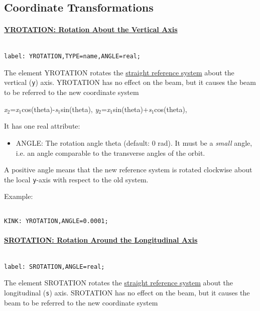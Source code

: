




\subsection{Coordinate Transformations}

\paragraph{\href{yrotation}{YROTATION: Rotation About the Vertical Axis}}
\begin{verbatim}

label: YROTATION,TYPE=name,ANGLE=real;
\end{verbatim} The element YROTATION rotates the \href{local_system.html#straight}{straight reference system} about the vertical (\texttt{y}) axis. YROTATION has no effect on the beam, but it causes the beam to be referred to the new coordinate system 

\textit{x}$_2$=\textit{x}$_1$cos(theta)-\textit{s}$_1$sin(theta), \textit{y}$_2$=\textit{x}$_1$sin(theta)+\textit{s}$_1$cos(theta), 

 It has one real attribute: 
\begin{itemize}
	\item ANGLE: The rotation angle theta (default: 0 rad). It must be a \emph{small} angle, i.e. an angle comparable to the transverse angles of the orbit. 
\end{itemize} A positive angle means that the new reference system is rotated clockwise about the local \texttt{y}-axis with respect to the old system. 

 Example: 
\begin{verbatim}

KINK: YROTATION,ANGLE=0.0001;
\end{verbatim}

\paragraph{\href{srotation}{SROTATION: Rotation Around the Longitudinal Axis}}
\begin{verbatim}

label: SROTATION,ANGLE=real;
\end{verbatim} The element SROTATION rotates the \href{local_system.html#straight}{straight reference system} about the longitudinal (\texttt{s}) axis. SROTATION has no effect on the beam, but it causes the beam to be referred to the new coordinate system 

